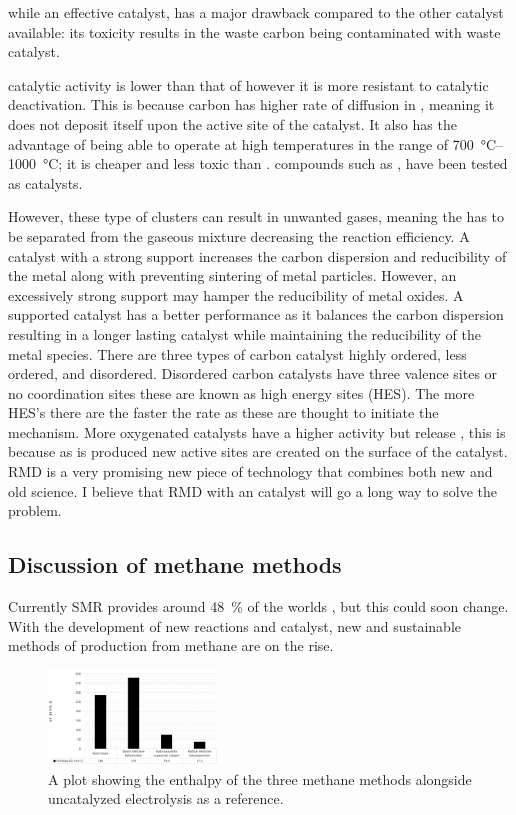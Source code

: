  while an effective catalyst, has a major drawback compared to the other catalyst available: its toxicity results in the waste carbon being contaminated with waste  catalyst.
 
 catalytic activity is lower than that of  however it is more resistant to catalytic deactivation.
This is because carbon has higher rate of diffusion in , meaning it does not deposit itself upon the active site of the catalyst.
It also has the advantage of being able to operate at high temperatures in the range of \SIrange{700}{1000}{\celsius}; it is cheaper and less toxic than .
 compounds such as \ce{[Fe(CO)5]}, \ce{[Fe(cp)2]} have been tested as catalysts.

However, these type of clusters can result in unwanted gases, meaning the  has to be separated from the gaseous mixture decreasing the reaction efficiency.
A catalyst with a strong support increases the carbon dispersion and reducibility of the metal along with preventing sintering of metal particles.
However, an excessively strong support may hamper the reducibility of metal oxides.
A supported catalyst has a better performance as it balances the carbon dispersion resulting in a longer lasting catalyst while maintaining the reducibility of the metal species.
There are three types of carbon catalyst highly ordered, less ordered, and disordered.
Disordered carbon catalysts have three valence sites or no coordination sites these are known as high energy sites (HES).
The more HES’s there are the faster the rate as these are thought to initiate the mechanism.
More oxygenated catalysts have a higher activity but release , this is because as  is produced new active sites are created on the surface of the catalyst.
RMD is a very promising new piece of technology that combines both new and old science.
I believe that RMD with an  catalyst will go a long way to solve the  problem.

\subsection{Discussion of methane methods}%
\label{sub:discussion_of_methane_methods}
Currently SMR provides around \SI{48}{\percent} of the worlds \cite{SBN2020}, but this could soon change.
With the development of new reactions and catalyst, new and sustainable methods of  production from methane are on the rise.

\begin{figure}[H]
	\centering
	\includegraphics[width=0.4\textwidth]{6b76c760-2cb9-11eb-895f-8c8590753a48.png}
	\caption{A plot showing the enthalpy of the three methane methods alongside uncatalyzed electrolysis as a reference.\cite{SBN2020,Ashok,Saxena2011}}
	\label{fig:ME_disc}
\end{figure}

